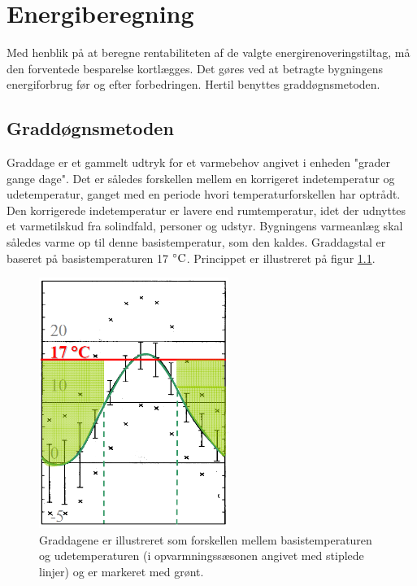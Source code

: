 \chapter{Energiberegning} \label{sec:energi}

Med henblik på at beregne rentabiliteten af de valgte energirenoveringstiltag, må den forventede besparelse kortlægges. Det gøres ved at betragte bygningens energiforbrug før og efter forbedringen. Hertil benyttes graddøgnsmetoden. 

\section{Graddøgnsmetoden}

Graddage er et gammelt udtryk for et varmebehov angivet i enheden "grader gange dage". Det er således forskellen mellem en korrigeret indetemperatur og udetemperatur, ganget med en periode hvori temperaturforskellen har optrådt. Den korrigerede indetemperatur er lavere end rumtemperatur, idet der udnyttes et varmetilskud fra solindfald, personer og udstyr. Bygningens varmeanlæg skal således varme op til denne basistemperatur, som den kaldes. Graddagstal er baseret på basistemperaturen 17 $^{\circ}\text{C}$. Princippet er illustreret på figur \ref{fig:gdmetode}.

\begin{figure}[H]
	\centering
	\includegraphics[width=0.55\textwidth]{billeder/graddage.png}
	\caption{Graddagene er illustreret som forskellen mellem basistemperaturen og udetemperaturen (i opvarmningssæsonen angivet med stiplede linjer) og er markeret med grønt.}
	\label{fig:gdmetode}
\end{figure}

